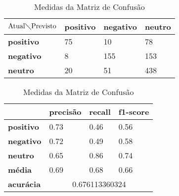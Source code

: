 \begin{table}[h!]
\centering
\begin{minipage}[b]{0.45\linewidth}
\caption{Matriz de Confusão Ternário: \textit{ADA Boost}}
\label{tab:mcb-nb}
\begin{tabular}{|l|l|l|l|}
\hline
$\textrm{Atual}\diagdown\textrm{Previsto}$ & \textbf{positivo} & \textbf{negativo} & \textbf{neutro}\\ \hline
\textbf{positivo} & 75 & 10 & 78\\ \hline
\textbf{negativo} & 8 & 155 & 153\\ \hline
\textbf{neutro} & 20 & 51 & 438\\ \hline
\end{tabular}
\end{minipage}
\hspace{0.5cm}
\begin{minipage}[b]{0.45\linewidth}

\centering
\caption{Medidas da Matriz de Confusão}
\label{tab:mmcb-nb}
\begin{tabular}{|l|l|l|l|}
\hline
         & \textbf{precisão} & \textbf{recall} & \textbf{f1-score} \\ \hline
\textbf{positivo} & 0.73     & 0.46   & 0.56     \\ \hline
\textbf{negativo} & 0.72     & 0.49   & 0.58     \\ \hline
\textbf{neutro} & 0.65     & 0.86   & 0.74     \\ \hline
\textbf{média} & 0.69     & 0.68   & 0.66     \\ \hline
\textbf{acurácia} & \multicolumn{3}{|c|}{0.676113360324}\\ \hline
\end{tabular}
\end{minipage}
\end{table}


